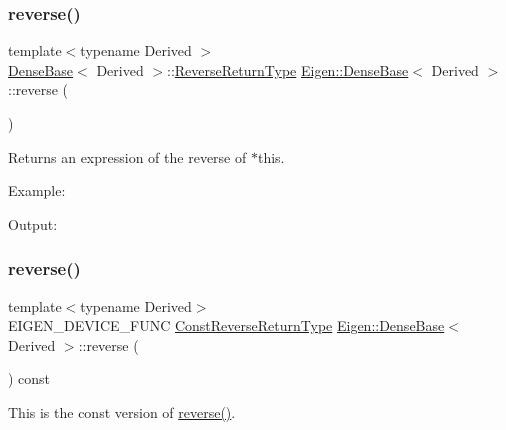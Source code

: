 \subsubsection{\texorpdfstring{reverse()}{reverse()}\hspace{0.1cm}{\footnotesize\ttfamily [1/2]}}
{\footnotesize\ttfamily template$<$typename Derived $>$ \\
\mbox{\hyperlink{class_eigen_1_1_dense_base}{Dense\+Base}}$<$ Derived $>$\+::\mbox{\hyperlink{class_eigen_1_1_reverse}{Reverse\+Return\+Type}} \mbox{\hyperlink{class_eigen_1_1_dense_base}{Eigen\+::\+Dense\+Base}}$<$ Derived $>$\+::reverse (\begin{DoxyParamCaption}{ }\end{DoxyParamCaption})\hspace{0.3cm}{\ttfamily [inline]}}

\begin{DoxyReturn}{Returns}
an expression of the reverse of $\ast$this.
\end{DoxyReturn}
Example\+: 
\begin{DoxyCodeInclude}{0}
\end{DoxyCodeInclude}
 Output\+: 
\begin{DoxyVerbInclude}
\end{DoxyVerbInclude}
 \mbox{\label{class_eigen_1_1_dense_base_ada2ea028e35de0beef990fa0f6e3dee1}} 
\subsubsection{\texorpdfstring{reverse()}{reverse()}\hspace{0.1cm}{\footnotesize\ttfamily [2/2]}}
{\footnotesize\ttfamily template$<$typename Derived$>$ \\
E\+I\+G\+E\+N\+\_\+\+D\+E\+V\+I\+C\+E\+\_\+\+F\+U\+NC \mbox{\hyperlink{class_eigen_1_1_reverse}{Const\+Reverse\+Return\+Type}} \mbox{\hyperlink{class_eigen_1_1_dense_base}{Eigen\+::\+Dense\+Base}}$<$ Derived $>$\+::reverse (\begin{DoxyParamCaption}{ }\end{DoxyParamCaption}) const\hspace{0.3cm}{\ttfamily [inline]}}

This is the const version of \mbox{\hyperlink{class_eigen_1_1_dense_base_a38ea394036d8b096abf322469c80198f}{reverse()}}. \mbox{\label{class_eigen_1_1_dense_base_adb8045155ea45f7961fc2a5170e1d921}} 
